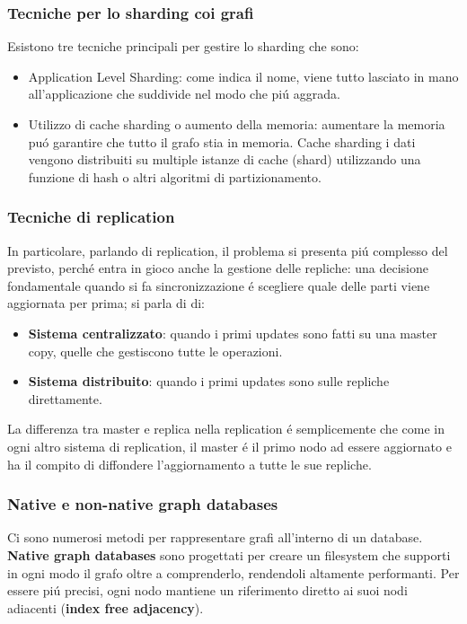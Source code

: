 \subsubsection*{Tecniche per lo sharding coi grafi}
Esistono tre tecniche principali per gestire lo sharding che sono:
\begin{itemize}
    \item Application Level Sharding: come indica il nome, viene tutto lasciato in mano all'applicazione che suddivide nel modo che piú aggrada. 
    \item Utilizzo di cache sharding o aumento della memoria: aumentare la memoria puó garantire che tutto il grafo stia in memoria. Cache sharding i dati vengono distribuiti su multiple istanze di cache (shard) utilizzando una funzione di hash o altri algoritmi di partizionamento.
\end{itemize}

\subsubsection*{Tecniche di replication}
In particolare, parlando di replication, il problema si presenta piú complesso del previsto, perché entra in gioco anche la gestione delle repliche: una decisione fondamentale quando si fa sincronizzazione é scegliere quale delle parti viene aggiornata per prima; si parla di di:
\begin{itemize}
    \item \textbf{Sistema centralizzato}: quando i primi updates sono fatti su una master copy, quelle che gestiscono tutte le operazioni.
    \item \textbf{Sistema distribuito}: quando i primi updates sono sulle repliche direttamente.
\end{itemize}
La differenza tra master e replica nella replication é semplicemente che come in ogni altro sistema di replication, il master é il primo nodo ad essere aggiornato e ha il compito di diffondere l'aggiornamento a tutte le sue repliche. 

\subsubsection*{Native e non-native graph databases}
Ci sono numerosi metodi per rappresentare grafi all'interno di un database. \textbf{Native graph databases} sono progettati per creare un filesystem che supporti in ogni modo il grafo oltre a comprenderlo, rendendoli altamente performanti. Per essere piú precisi, ogni nodo mantiene un riferimento diretto ai suoi nodi adiacenti (\textbf{index free adjacency}).

